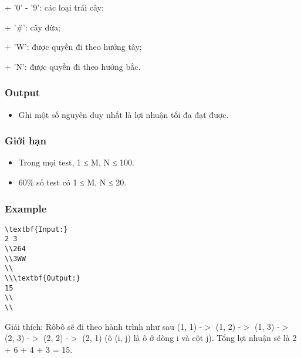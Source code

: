    + '0' - '9': các loại trái cây;  

   + '\#': cây dừa;  

   + 'W': được quyền đi theo hướng tây;  

   + 'N': được quyền đi theo hướng bắc.  

\subsubsection{   Output  }
\begin{itemize}
	\item     Ghi một số nguyên duy nhất là lợi nhuận tối đa đạt được.   
\end{itemize}

\subsubsection{   Giới hạn  }
\begin{itemize}
	\item     Trong mọi test, 1 ≤ M, N ≤ 100.   
	\item     60\% số test có 1 ≤ M, N ≤ 20.   
\end{itemize}

\subsubsection{   Example  }
\begin{verbatim}
\textbf{Input:}
2 3
\\264
\\3WW
\\
\\\textbf{Output:}
15
\\
\\\end{verbatim}

Giải thích: Rôbô sẽ đi theo hành trình như sau (1, 1) -$>$ (1, 2) -$>$ (1, 3) -$>$ (2, 3) -$>$ (2, 2) -$>$ (2, 1) (ô (i, j) là ô ở dòng i và cột j). Tổng lợi nhuận sẽ là 2 + 6 + 4 + 3 = 15.
